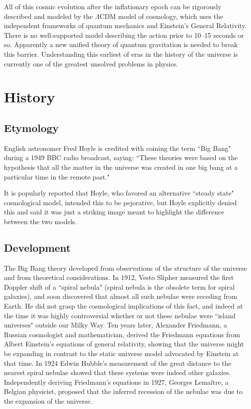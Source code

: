 \documentclass[14pt, oneside]{book}
\begin{document}
		All of this cosmic evolution after the inflationary epoch can be rigorously described and modeled by the $\Lambda$CDM model of cosmology, which uses the independent frameworks of quantum mechanics and Einstein's General Relativity. There is no well-supported model describing the action prior to 10--15 seconds or so. Apparently a new unified theory of quantum gravitation is needed to break this barrier. Understanding this earliest of eras in the history of the universe is currently one of the greatest unsolved problems in physics.

\chapter{History}
	\section{Etymology}
		English astronomer Fred Hoyle is credited with coining the term ``Big Bang" during a 1949 BBC radio broadcast, saying: ``These theories were based on the hypothesis that all the matter in the universe was created in one big bang at a particular time in the remote past."
		
		It is popularly reported that Hoyle, who favored an alternative ``steady state" cosmological model, intended this to be pejorative, but Hoyle explicitly denied this and said it was just a striking image meant to highlight the difference between the two models.
	
	\section{Development}
		The Big Bang theory developed from observations of the structure of the universe and from theoretical considerations. In 1912, Vesto Slipher measured the first Doppler shift of a ``spiral nebula" (spiral nebula is the obsolete term for spiral galaxies), and soon discovered that almost all such nebulae were receding from Earth. He did not grasp the cosmological implications of this fact, and indeed at the time it was highly controversial whether or not these nebulae were ``island universes" outside our Milky Way. Ten years later, Alexander Friedmann, a Russian cosmologist and mathematician, derived the Friedmann equations from Albert Einstein's equations of general relativity, showing that the universe might be expanding in contrast to the static universe model advocated by Einstein at that time. In 1924 Edwin Hubble's measurement of the great distance to the nearest spiral nebulae showed that these systems were indeed other galaxies. Independently deriving Friedmann's equations in 1927, Georges Lemaître, a Belgian physicist, proposed that the inferred recession of the nebulae was due to the expansion of the universe.
\end{document}
